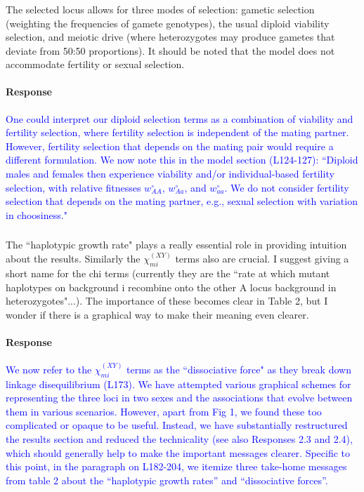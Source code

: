\documentclass[10pt,letterpaper]{article}
\begin{document}
\noindent\subsubsection{}

The selected locus allows for three modes of selection: gametic selection (weighting the frequencies of gamete genotypes), the usual diploid viability selection, and meiotic drive (where heterozygotes may produce gametes that deviate from 50:50 proportions).  It should be noted that the model does not accommodate fertility or sexual selection.

\noindent\paragraph{Response}
\textcolor{blue}{
One could interpret our diploid selection terms as a combination of viability and fertility selection, where fertility selection is independent of the mating partner.
However, fertility selection that depends on the mating pair would require a different formulation.
We now note this in the model section (L124-127):
``Diploid males and females then experience viability and/or individual-based fertility selection, with relative fitnesses $w_{AA}^{\circ}$, $w_{Aa}^{\circ}$, and $w_{aa}^{\circ}$.
We do not consider fertility selection that depends on the mating partner, e.g., sexual selection with variation in choosiness."
}

\noindent\subsubsection{}
The ``haplotypic growth rate" plays a really essential role in providing intuition about the results. Similarly the $\chi_{mi}^{(XY)}$ terms also are crucial.  I suggest giving a short name for the chi terms (currently they are the ``rate at which mutant haplotypes on background i recombine onto the other A locus background in heterozygotes"...).   The importance of these becomes clear in Table 2, but I wonder if there is a graphical way to make their meaning even clearer.  

\noindent\paragraph{Response}
\textcolor{blue}{
We now refer to the $\chi_{mi}^{(XY)}$ terms as the ``dissociative force" as they break down linkage disequilibrium (L173). 
We have attempted various graphical schemes for representing the three loci in two sexes and the associations that evolve between them in various scenarios. 
However, apart from Fig 1, we found these too complicated or opaque to be useful. 
Instead, we have substantially restructured the results section and reduced the technicality (see also Responses 2.3 and 2.4), which should generally help to make the important messages clearer. 
Specific to this point, in the paragraph on L182-204, we itemize three take-home messages from table 2 about the ``haplotypic growth rates'' and ``dissociative forces''. 
}
\end{document}
